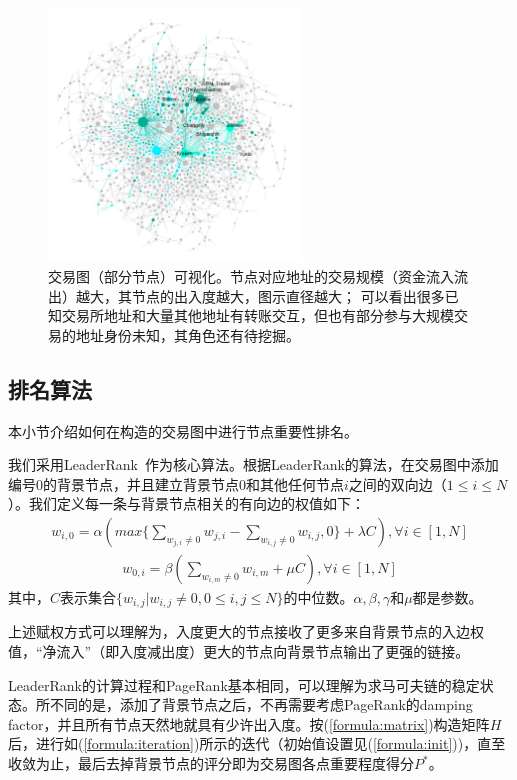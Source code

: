 \begin{figure}[!htbp]
	\centering
	\includegraphics[width=0.6\textwidth]{figs/wgc1.png}
  \caption{交易图（部分节点）可视化。\small{节点对应地址的交易规模（资金流入流出）越大，其节点的出入度越大，图示直径越大；
      可以看出很多已知交易所地址和大量其他地址有转账交互，但也有部分参与大规模交易的地址身份未知，其角色还有待挖掘。}}\label{fig:wgc}
\end{figure}

\subsection{排名算法} \label{subsec:leaderrank}
本小节介绍如何在构造的交易图中进行节点重要性排名。

我们采用LeaderRank~\cite{Chen2013}\cite{Li2014}作为核心算法。根据LeaderRank的算法，在交易图中添加编号$0$的背景节点，并且建立背景节点$0$和其他任何节点$i$之间的双向边（$1\leq i \leq N$）。我们定义每一条与背景节点相关的有向边的权值如下：
\begin{align}\label{formula:weight1}
w_{i,0} = \alpha( max\{ \sum_{w_{j,i} \neq 0} w_{j,i} - \sum_{w_{i,j} \neq 0} w_{i,j} , 0\} + \lambda C ), \forall i \in [1,N]	
\end{align}
\begin{align}\label{formula:weight2} 
w_{0,i}	= \beta ( \sum_{w_{i,m} \neq 0} w_{i,m} + \mu C), \forall i \in [1,N]
\end{align}
其中，$C$表示集合$\{w_{i,j} | w_{i,j} \neq 0, 0\leq i,j \leq N\}$的中位数。$\alpha, \beta, \gamma$和$\mu$都是参数。

上述赋权方式可以理解为，入度更大的节点接收了更多来自背景节点的入边权值，“净流入”（即入度减出度）更大的节点向背景节点输出了更强的链接。

LeaderRank的计算过程和PageRank基本相同，可以理解为求马可夫链的稳定状态。所不同的是，添加了背景节点之后，不再需要考虑PageRank的damping factor\cite{Brin2010}\cite{page1999pagerank}，并且所有节点天然地就具有少许出入度。按(\ref{formula:matrix})构造矩阵$H$后，进行如(\ref{formula:iteration})所示的迭代（初始值设置见(\ref{formula:init}))，直至收敛为止，最后去掉背景节点的评分即为交易图各点重要程度得分$P^*$。

